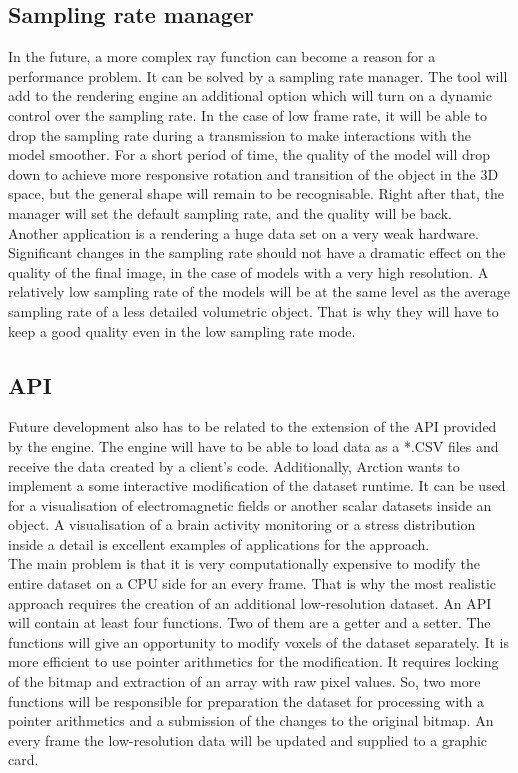 \documentclass[twoside, english, 11pt]{report}
\begin{document}
\subsection{Sampling rate manager}
 
In the future, a more complex ray function can become a reason for a performance problem. It can be solved by a sampling rate manager. The tool will add to the rendering engine an additional option which will turn on a dynamic control over the sampling rate. In the case of low frame rate, it will be able to drop the sampling rate during a transmission to make interactions with the model smoother. For a short period of time, the quality of the model will drop down to achieve more responsive rotation and transition of the object in the 3D space, but the general shape will remain to be recognisable. Right after that, the manager will set the default sampling rate, and the quality will be back.\\

Another application is a rendering a huge data set on a very weak hardware. Significant changes in the sampling rate should not have a dramatic effect on the quality of the final image, in the case of models with a very high resolution. A relatively low sampling rate of the models will be at the same level as the average sampling rate of a less detailed volumetric object. That is why they will have to keep a good quality even in the low sampling rate mode.


\subsection{API}

Future development also has to be related to the extension of the API provided by the engine. The engine will have to be able to load data as a *.CSV files and receive the data created by a client's code. Additionally, Arction wants to implement a some interactive modification of the dataset runtime. It can be used for a visualisation of electromagnetic fields or another scalar datasets inside an object. A visualisation of a brain activity monitoring or a stress distribution inside a detail is excellent examples of applications for the approach. \\

The main problem is that it is very computationally expensive to modify the entire dataset on a CPU side for an every frame. That is why the most realistic approach requires the creation of an additional low-resolution dataset. An API will contain at least four functions. Two of them are a getter and a setter. The functions will give an opportunity to modify voxels of the dataset separately. It is more efficient to use pointer arithmetics for the modification. It requires locking of the bitmap and extraction of an array with raw pixel values. So, two more functions will be responsible for preparation the dataset for processing with a pointer arithmetics and a submission of the changes to the original bitmap. An every frame the low-resolution data will be updated and supplied to a graphic card. \\
\end{document}
